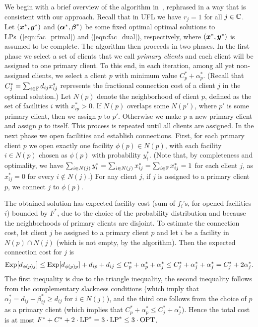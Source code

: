 \documentclass[11pt]{article}
\begin{document}
We begin with a brief overview of the algorithm
in~\cite{gupta08}, rephrased in a way that is consistent
with our approach.  Recall that in UFL we have $r_j=1$ for
all $j\in\mathbb{C}$. Let $(\boldsymbol{x}^\ast,\boldsymbol{y}^\ast)$ and
$(\boldsymbol{\alpha}^\ast,\boldsymbol{\beta}^\ast)$ be some fixed optimal optimal
solutions to LPs~(\ref{eqn:fac_primal}) and
(\ref{eqn:fac_dual}), respectively, where
$(\boldsymbol{x}^\ast,\boldsymbol{y}^\ast)$ is assumed to be complete. The
algorithm then proceeds in two phases. In the first phase we
select a set of clients that we call \emph{primary clients}
and each client will be assigned to one primary client. To
this end, in each iteration, among all yet non-assigned
clients, we select a client $p$ with minimum value
$C_p^\ast+\alpha_p^\ast$. (Recall that
$C_j^\ast=\sum_{i\in\mathbb{F}} d_{ij}x_{ij}^\ast$ represents
the fractional connection cost of a client $j$ in the
optimal solution.) Let $N(p)$ denote the neighborhood of
client $p$, defined as the set of facilities $i$ with
$x_{ip}^\ast>0$.  If $N(p)$ overlaps some $N(p')$, where
$p'$ is some primary client, then we assign $p$ to
$p'$. Otherwise we make $p$ a new primary client and assign
$p$ to itself. This process is repeated until all clients
are assigned. In the next phase we open facilities and
establish connections. First, for each primary client $p$ we
open exactly one facility $\phi(p)\in N(p)$, with each
facility $i\in N(p)$ chosen as $\phi(p)$ with probability
$y_i^\ast$. (Note that, by completeness and optimality, we
have $\sum_{i\in N(j)} y_i^\ast = \sum_{i\in N(j)}
x_{ij}^\ast= \sum_{i\in \mathbb{F}} x_{ij}^\ast = 1$ for each
client $j$, as $x_{ij}^\ast=0$ for every $i\notin N(j)$.)
For any client $j$, if $j$ is assigned to a primary client
$p$, we connect $j$ to $\phi(p)$.

The obtained solution has expected facility cost (sum of
$f_i$'s, for opened facilities $i$) bounded by
$F^\ast$, due to the choice of the probability distribution
and because the neighborhoods of primary clients are
disjoint. To estimate the connection cost, let client $j$ be
assigned to a primary client $p$ and let $i$ be a facility
in $N(p)\cap N(j)$ (which is not empty, by the algorithm).
Then the expected connection cost for $j$ is
%
\begin{eqnarray*}
\mbox{\rm Exp}[d_{\phi(p)j}] \leq \mbox{\rm Exp}[d_{\phi(p)p}] + d_{ip} + d_{ij} 
					\leq C_p^\ast + \alpha_p^\ast + \alpha_j^\ast 
					\leq C_j^\ast + \alpha_j^\ast + \alpha_j^\ast 
					= C_j^\ast + 2\alpha_j^\ast. 
\end{eqnarray*}
%
The first inequality is due to the triangle
inequality, the second inequality follows from the complementary
slackness conditions (which imply that $\alpha_j^\ast = d_{ij} +
\beta_{ij}^\ast \geq d_{ij}$ for $i\in N(j)$), and the third one follows
from the choice of $p$ as a primary client (which implies that
$C_p^\ast + \alpha_p^\ast \le C_j^\ast + \alpha_j^\ast)$. 
Hence the total cost is at
most $F^\ast + C^\ast+ 2\cdot\mbox{\rm LP}^\ast = 3\cdot\mbox{\rm LP}^\ast \leq 3\cdot\mbox{\rm OPT}$.
\end{document}
